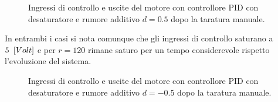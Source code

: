 		
		\begin{figure}[H]
			\centering
			 
			\caption{Ingressi di controllo e uscite del motore con controllore PID con desaturatore e rumore additivo $d=0.5$ dopo la taratura manuale.}
			\label{fig:PIDd_0_5}
		\end{figure}
		
		\noindent In entrambi i casi si  nota comunque che gli ingressi di controllo saturano a $5 \singleSpacing [Volt]$ e per $r=120$ rimane saturo per un tempo considerevole rispetto l'evoluzione del sistema.
		

		
		\begin{figure}[H]
			\centering
			 
			\caption{Ingressi di controllo e uscite del motore con controllore PID con desaturatore e rumore additivo $d=-0.5$ dopo la taratura manuale.}
			\label{fig:PIDd__0_5}		
		\end{figure}		
		
		
		
		
		
		
		